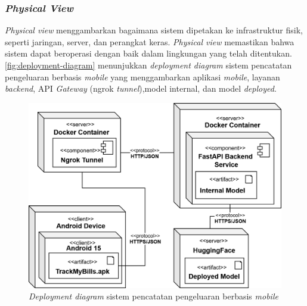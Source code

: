 \subsubsection{\emph{Physical View}}
\label{subsubsec:physical-view}
\emph{Physical view} menggambarkan bagaimana sistem dipetakan ke infrastruktur fisik, seperti jaringan, server, dan perangkat keras. \emph{Physical view} memastikan bahwa sistem dapat beroperasi dengan baik dalam lingkungan yang telah ditentukan. \autoref{fig:deployment-diagram} menunjukkan \emph{deployment diagram} sistem pencatatan pengeluaran berbasis \emph{mobile} yang menggambarkan aplikasi \emph{mobile}, layanan \emph{backend}, API \emph{Gateway} (ngrok \emph{tunnel}),model internal, dan model \emph{deployed}.
\begin{figure}[htbp]
    \centering
    \includegraphics[width=1\textwidth]{images/deployment-diagram.png}
    \caption{\emph{Deployment diagram} sistem pencatatan pengeluaran berbasis \emph{mobile}}
    \label{fig:deployment-diagram}
\end{figure}
